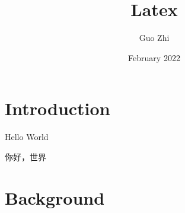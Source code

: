 \documentclass[twocolumn]{ctexart}
\title{Latex}
\author{Guo Zhi}
\date{February 2022}
\begin{document}
\maketitle

\newpage

\section{Introduction}

Hello World

你好，世界

\section{Background}



\end{document}
